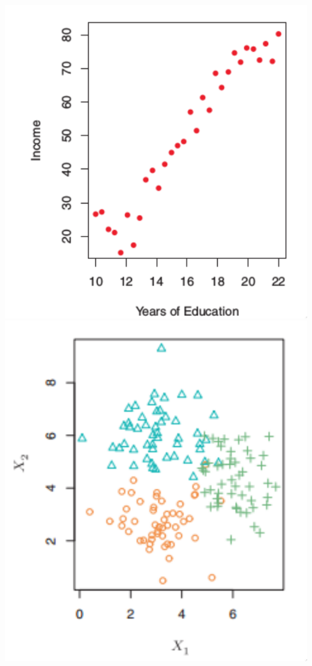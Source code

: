 \documentclass[leqno, 10pt, envcountsect]{beamer}
\numberwithin{equation}{section}
\theoremstyle{definition}
\theoremstyle{example}
\numberwithin{figure}{section}
\numberwithin{table}{section}
\begin{document}
\begin{frame}[fragile=singleslide]
\begin{center}
    \includegraphics[scale=0.16]{supervised.png}
    \includegraphics[scale=0.17]{unsupervised.png}
  \end{center}
\end{frame}
\end{document}
